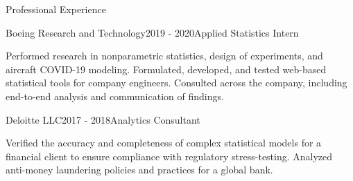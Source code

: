 \documentclass{resume} %
\begin{document}
\begin{rSection}{Professional Experience}

\begin{rSubsection}{Boeing Research and Technology}{2019 - 2020}{Applied Statistics Intern}{}

Performed research in nonparametric statistics, design of experiments, and aircraft COVID-19 modeling. Formulated, developed, and tested web-based statistical tools for company engineers. Consulted across the company, including end-to-end analysis and communication of findings.
\end{rSubsection}

\begin{rSubsection}{Deloitte LLC}{2017 - 2018}{Analytics Consultant}{}

Verified the accuracy and completeness of complex statistical models for a financial client to ensure compliance with regulatory stress-testing. Analyzed anti-money laundering policies and practices for a global bank.
\end{rSubsection}

\end{rSection}
\end{document}
